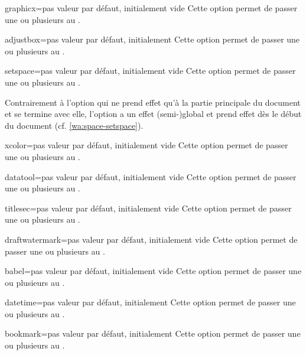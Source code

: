 \begin{docKey}{graphicx}{=}{pas valeur par défaut,
    initialement vide}
  Cette option permet de passer une ou plusieurs  au
  .
\end{docKey}
\begin{docKey}{adjustbox}{=}{pas valeur par défaut,
    initialement }
  Cette option permet de passer une ou plusieurs  au
  .
\end{docKey}
\begin{docKey}{setspace}{=}{pas valeur par défaut,
    initialement vide}
  Cette option permet de passer une ou plusieurs  au
  .

  Contrairement à l'option  qui ne prend effet qu'à la partie
  principale du document et se termine avec elle, l'option 
  a un effet (semi-)global et prend effet dès le début du document
  (cf. \vref{wa:space-setspace}).
\end{docKey}
\begin{docKey}{xcolor}{=}{pas valeur par défaut,
    initialement vide}
  Cette option permet de passer une ou plusieurs  au
  .
\end{docKey}
\begin{docKey}{datatool}{=}{pas valeur par défaut,
    initialement vide}
  Cette option permet de passer une ou plusieurs  au
  .
\end{docKey}
\begin{docKey}{titlesec}{=}{pas valeur par défaut, initialement
    vide}
  Cette option permet de passer une ou plusieurs  au
  .
\end{docKey}
\begin{docKey}{draftwatermark}{=}{pas valeur par défaut,
    initialement vide}
  Cette option permet de passer une ou plusieurs  au
  .
\end{docKey}
\begin{docKey}{babel}{=}{pas valeur par défaut,
    initialement vide}
  Cette option permet de passer une ou plusieurs  au
  .
\end{docKey}
\begin{docKey}{datetime}{=}{pas valeur par défaut,
    initialement }
  Cette option permet de passer une ou plusieurs  au
  .
\end{docKey}
\begin{docKey}{bookmark}{=}{pas valeur par défaut,
    initialement }
  Cette option permet de passer une ou plusieurs  au
  .
\end{docKey}

